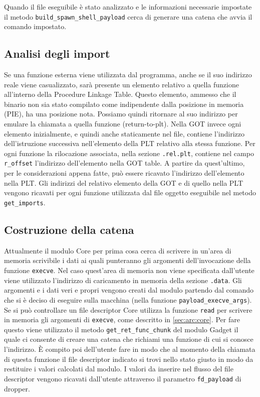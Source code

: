Quando il file eseguibile è stato analizzato e le informazioni
necessarie impostate il metodo \lstinline{build_spawn_shell_payload}
cerca di generare una catena che avvia il comando impostato.

\subsection{Analisi degli import}

Se una funzione esterna viene utilizzata dal programma, anche se il
suo indirizzo reale viene casualizzato, sarà presente un elemento
relativo a quella funzione all'interno della Procedure Linkage
Table. Questo elemento, ammesso che il binario non sia stato compilato
come indipendente dalla posizione in memoria (PIE), ha una posizione
nota. Possiamo quindi ritornare al suo indirizzo per emulare la
chiamata a quella funzione (return-to-plt). Nella GOT invece ogni
elemento inizialmente, e quindi anche staticamente nel file, contiene
l'indirizzo dell'istruzione successiva nell'elemento della PLT
relativo alla stessa funzione. Per ogni funzione la rilocazione
associata, nella sezione \lstinline{.rel.plt}, contiene nel campo
\lstinline{r_offset} l'indirizzo dell'elemento nella GOT table. A
partire da quest'ultimo, per le considerazioni appena fatte, può
essere ricavato l'indirizzo dell'elemento nella PLT. Gli indirizzi del
relativo elemento della GOT e di quello nella PLT vengono ricavati per
ogni funzione utilizzata dal file oggetto eseguibile nel metodo
\lstinline{get_imports}.

\subsection{Costruzione della catena}

Attualmente il modulo Core per prima cosa cerca di scrivere in un'area
di memoria scrivibile i dati ai quali punteranno gli argomenti
dell'invocazione della funzione \lstinline{execve}. Nel caso
quest'area di memoria non viene specificata dall'utente viene
utilizzato l'indirizzo di caricamento in memoria della sezione
\lstinline{.data}. Gli argomenti e i dati veri e propri vengono creati
dal modulo partendo dal comando che si è deciso di eseguire sulla
macchina (nella funzione \lstinline{payload_execve_args}). Se si può
controllare un file descriptor Core utilizza la funzione
\lstinline{read} per scrivere in memoria gli argomenti di
\lstinline{execve}, come descritto in \ref{sec:arc:core}. Per fare
questo viene utilizzato il metodo \lstinline{get_ret_func_chunk} del
modulo Gadget il quale ci consente di creare una catena che
richiami una funzione di cui si conosce l'indirizzo. È compito poi
dell'utente fare in modo che al momento della chiamata di questa
funzione il file descriptor indicato si trovi nello stato giusto in
modo da restituire i valori calcolati dal modulo. I valori da inserire
nel flusso del file descriptor vengono ricavati dall'utente attraverso
il parametro \lstinline{fd_payload} di dropper.


